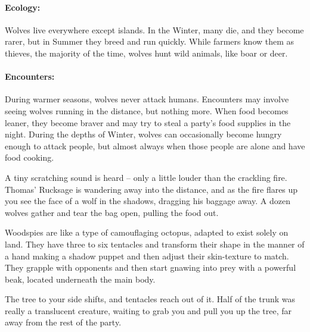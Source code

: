\begin{multicols}{2}
\mouthdigger

\label{wolf}

\paragraph{Ecology:} Wolves live everywhere except islands.  In the Winter, many die, and they become rarer, but in Summer they breed and run quickly.  While farmers know them as thieves, the majority of the time, wolves hunt wild animals, like boar or deer.


\paragraph{Encounters:} During warmer seasons, wolves never attack humans.  Encounters may involve seeing wolves running in the distance, but nothing more.  When food becomes leaner, they become braver and may try to steal a party's food supplies in the night.  During the depths of Winter, wolves can occasionally become hungry enough to attack people, but almost always when those people are alone and have food cooking.

\begin{boxtext}

	A tiny scratching sound is heard -- only a little louder than the crackling fire.
	Thomas' Rucksage is wandering away into the distance, and as the fire flares up you see the face of a wolf in the shadows, dragging his baggage away.
	A dozen wolves gather and tear the bag open, pulling the food out.

\end{boxtext}

\label{woodspy}

Woodspies are like a type of camouflaging octopus, adapted to exist solely on land.  They have three to six tentacles and transform their shape in the manner of a hand making a shadow puppet and then adjust their skin-texture to match.  They grapple with opponents and then start gnawing into prey with a powerful beak, located underneath the main body.

\begin{boxtext}

	The tree to your side shifts, and tentacles reach out of it.
	Half of the trunk was really a translucent creature, waiting to grab you and pull you up the tree, far away from the rest of the party.


\end{boxtext}
\end{multicols}
